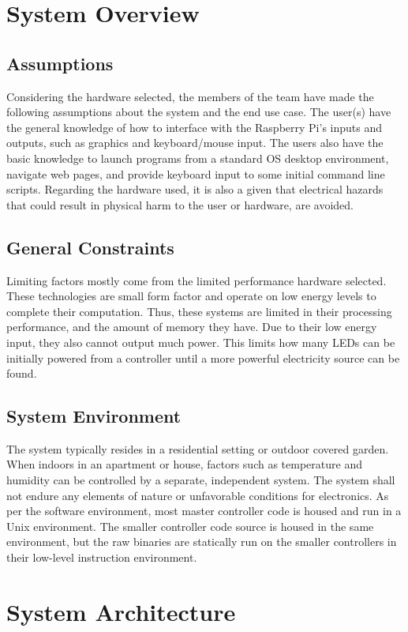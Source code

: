 \documentclass[onecolumn, draftclsnofoot,10pt, compsoc]{IEEEtran}
\begin{document}
	\section{System Overview}
		\subsection{Assumptions}
		Considering the hardware selected, the members of the team have made the following assumptions about the system and the end use case. The user(s) have
		the general knowledge of how to interface with the Raspberry Pi's inputs and outputs, such as graphics and keyboard/mouse input. The users also have the
		basic knowledge to launch programs from a standard OS desktop environment, navigate web pages, and provide keyboard input to some initial command line scripts.
		Regarding the hardware used, it is also a given that electrical hazards that could result in physical harm to the user or hardware, are avoided.

		\subsection{General Constraints}
		Limiting factors mostly come from the limited performance hardware selected. These technologies are small form factor and operate on low energy levels
		to complete their computation. Thus, these systems are limited in their processing performance, and the amount of memory they have. Due to their
		low energy input, they also cannot output much power. This limits how many LEDs can be initially powered from a controller until a more powerful
		electricity source can be found.

		\subsection{System Environment}
		The system typically resides in a residential setting or outdoor covered garden. When indoors in an apartment or house, factors such as temperature and
		humidity can be controlled by a separate, independent system. The system shall not endure any elements of nature or unfavorable conditions
		for electronics. As per the software environment, most master controller code is housed and run in a Unix environment.
		The smaller controller code source is housed in the same environment, but the raw binaries are statically run on the smaller controllers in their low-level instruction environment.

	\section{System Architecture}
\end{document}
